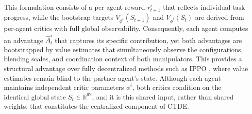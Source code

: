 \documentclass[a4paper,fleqn]{cas-dc}
\begin{document}
This formulation consists of a per-agent reward $r_{t+1}^i$ that reflects individual task progress, while the bootstrap targets $V_{\phi^i}(S_{t+1})$ and $V_{\phi^i}(S_t)$ are derived from per-agent critics with full global observability. Consequently, each agent computes an advantage $\hat{A}_t^i$ that captures its specific contribution, yet both advantages are bootstrapped by value estimates that simultaneously observe the configurations, blending scales, and coordination context of both manipulators. This provides a structural advantage over fully decentralized methods such as IPPO \cite{IPPO}, where value estimates remain blind to the partner agent's state. Although each agent maintains independent critic parameters $\phi^i$, both critics condition on the identical global state $S_t \in \mathbb{R}^{92}$, and it is this shared input, rather than shared weights, that constitutes the centralized component of CTDE.
\end{document}
